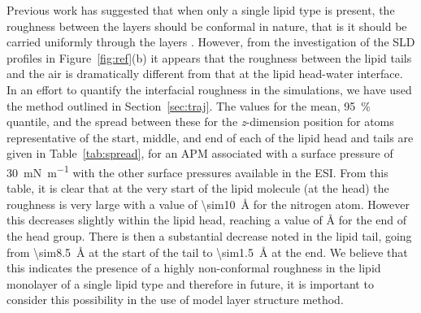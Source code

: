 \documentclass[amsmath,amssymb,twocolumn,superscriptaddress]{revtex4-1}
\begin{document}
Previous work has suggested that when only a single lipid type is present, the roughness between the layers should be conformal in nature, that is it should be carried uniformly through the layers \cite{kozhevnikov_general_2012,campbell_structure_2018}.
However, from the investigation of the SLD profiles in Figure~\ref{fig:ref}(b) it appears that the roughness between the lipid tails and the air is dramatically different from that at the lipid head-water interface.
In an effort to quantify the interfacial roughness in the simulations, we have used the method outlined in Section~\ref{sec:traj}.
The values for the mean, \SI{95}{\percent} quantile, and the spread between these for the \emph{z}-dimension position for atoms representative of the start, middle, and end of each of the lipid head and tails are given in Table~\ref{tab:spread}, for an APM associated with a surface pressure of \SI{30}{\milli\newton\per\meter} with the other surface pressures available in the ESI.
From this table, it is clear that at the very start of the lipid molecule (at the head) the roughness is very large with a value of \SI{\sim10}{\angstrom} for the nitrogen atom.
However this decreases slightly within the lipid head, reaching a value of \si{\angstrom} for the end of the head group.
There is then a substantial decrease noted in the lipid tail, going from \SI{\sim8.5}{\angstrom} at the start of the tail to \SI{\sim1.5}{\angstrom} at the end.
We believe that this indicates the presence of a highly non-conformal roughness in the lipid monolayer of a single lipid type and therefore in future, it is important to consider this possibility in the use of model layer structure method.
%
\end{document}
